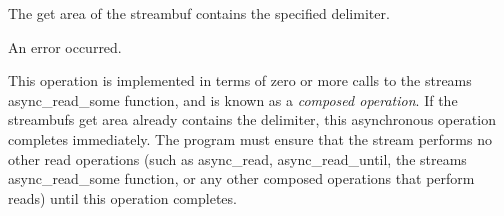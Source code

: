 \begin{DoxyItemize}
\item The get area of the streambuf contains the specified delimiter.\end{DoxyItemize}
\begin{DoxyItemize}
\item An error occurred.\end{DoxyItemize}
This operation is implemented in terms of zero or more calls to the stream\textquotesingle{}s async\+\_\+read\+\_\+some function, and is known as a {\itshape composed operation}. If the streambuf\textquotesingle{}s get area already contains the delimiter, this asynchronous operation completes immediately. The program must ensure that the stream performs no other read operations (such as async\+\_\+read, async\+\_\+read\+\_\+until, the stream\textquotesingle{}s async\+\_\+read\+\_\+some function, or any other composed operations that perform reads) until this operation completes.


